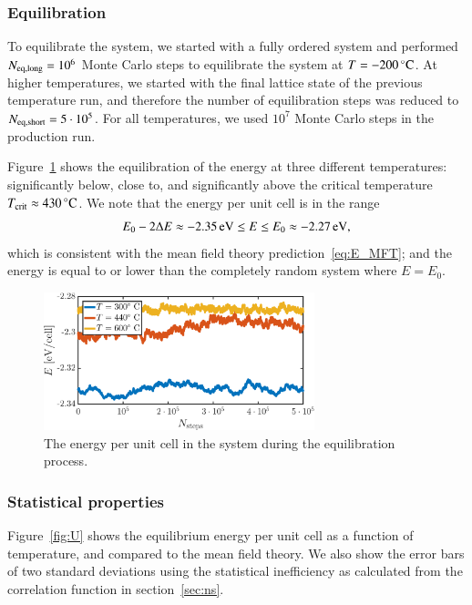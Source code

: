 \subsubsection*{Equilibration}
To equilibrate the system, we started with a fully ordered system and performed $N_{\rm eq, long} = 10^6$ Monte Carlo steps to equilibrate the system at $T = \unit[-200]{^\circ C}$. At higher temperatures, we started with the final lattice state of the previous temperature run, and therefore the number of equilibration steps was reduced to $N_{\rm eq, short} = 5 \cdot 10^5$. For all temperatures, we used $10^7$ Monte Carlo steps in the production run. 

Figure~\ref{fig:T2:equil} shows the equilibration of the energy at
three different temperatures: significantly below, close to, and
significantly above the critical temperature
$T_{\rm crit} \approx \unit[430]{^\circ C}$. 
We note that the energy per unit cell is in the range 
\begin{equation}
E_0 - 2 \Delta E \approx \unit[-2.35 ]{eV}\leq E\leq  E_0
\approx \unit[-2.27]{eV},
\label{eq:E-range}
\end{equation}
which is consistent with the mean field theory
prediction~\eqref{eq:E_MFT}; and the energy is equal to or lower than
the completely random system where $E = E_0$.  

\begin{figure}[!ht]
\begin{center}
  \includegraphics[width=0.7\textwidth]{../figures/equilibration} 
  \caption{The energy per unit cell in the system during the equilibration process.}
  \label{fig:T2:equil}
\end{center}
\end{figure}

\subsubsection*{Statistical properties}
Figure~\ref{fig:U} shows the equilibrium energy per unit cell as a
function of temperature, and compared to the mean field theory. We
also show the error bars of two standard deviations using the
statistical inefficiency as calculated from the correlation function
in section~\ref{sec:ns}.  


